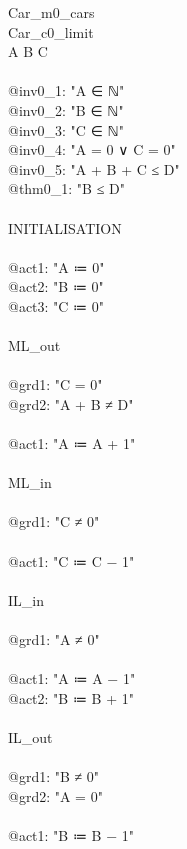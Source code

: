 \begin{description}
	\begin{center}
		\begin{Bcode}
			\ifplastex
			\Bmachine{} Car_m0_cars\\
			\Bsees{} Car_c0_limit\\
			\Bvariables{} A B C\\
			\Binvariants\\
			@inv0_1: "A ∈ ℕ"\\
			@inv0_2: "B ∈ ℕ"\\
			@inv0_3: "C ∈ ℕ"\\
			@inv0_4: "A = 0 ∨ C = 0"\\
			@inv0_5: "A + B + C ≤ D"\\
			@thm0_1: "B ≤ D" \Btheorem\\
			\Bevents\\
			INITIALISATION\\
			\Bbegin\\
			@act1: "A ≔ 0"\\
			@act2: "B ≔ 0"\\
			@act3: "C ≔ 0"\\
			\Bend\\
			ML_out\\
			\Bwhen\\
			@grd1: "C = 0"\\
			@grd2: "A + B ≠ D"\\
			\Bthen\\
			@act1: "A ≔ A + 1"\\
			\Bend\\
			ML_in\\
			\Bwhen\\
			@grd1: "C ≠ 0"\\
			\Bthen\\
			@act1: "C ≔ C − 1"\\
			\Bend\\
			IL_in\\
			\Bwhen\\
			@grd1: "A ≠ 0"\\
			\Bthen\\
			@act1: "A ≔ A − 1"\\
			@act2: "B ≔ B + 1"\\
			\Bend\\
			IL_out\\
			\Bwhen\\
			@grd1: "B ≠ 0"\\
			@grd2: "A = 0"\\
			\Bthen\\
			@act1: "B ≔ B − 1"\\

\end{Bcode}
\end{center}
\end{description}
